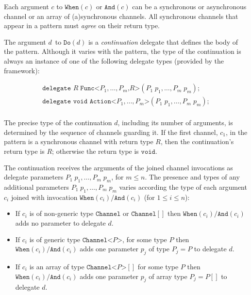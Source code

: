 \documentclass{article}
\newcommand{\dlongreturn}[2]{{\texttt{Func<}#2\texttt{,}#1\texttt{>}}}
\newcommand{\dlongreturnvoid}[1]{{\texttt{Action<}#1\texttt{>}}}
\newcommand{\dreturnvoid}[1]{{\texttt{Continuation}}}
\newcommand{\When}{\texttt{When}}
\newcommand{\And}{\texttt{And}}
\newcommand{\Do}{\texttt{Do}}
\newcommand{\channel}{\ensuremath{c}}
\newcommand{\delegate}{\ensuremath{d}}
\newcommand{\tvarr}{\ensuremath{R}}
\begin{document}
Each argument $\channel$ to $\When(\channel)$ or $\And(\channel)$ can be a synchronous or asynchronous channel or an array of (a)synchronous channels.
All synchronous channels that appear in a pattern must \emph{agree} on their return type.

The argument \delegate\ to $\Do(\delegate)$ is a \emph{continuation} delegate that defines the body of the pattern.
Although it varies with the pattern,  the type of the continuation is always an instance of one of the following delegate types (provided by the framework):

\[ 
\begin{array}{l}
  \texttt{delegate } \tvarr\; \dlongreturn{\tvarr}{P_1,\ldots,P_m}(P_1\;p_1, \ldots,  P_m\;p_m );\\
  \texttt{delegate void } \dlongreturnvoid{P_1,\ldots,P_m}(P_1\;p_1, \ldots,  P_m\;p_m );\\
\end{array}
\]

The precise type of the continuation \delegate, including its number of arguments, is determined by the sequence of channels guarding it.
If the first channel, $\channel_1$, in the pattern is a synchronous  channel with return type $\tvarr$, then
the continuation's return type is $\tvarr$; otherwise the return type is $\texttt{void}$.


The continuation receives the arguments of the joined channel invocations 
as delegate parameters $P_1\;p_1, \ldots,  P_m\;p_m$, for $m\leq n$.
The presence and types of any additional parameters $P_1\;p_1, \ldots,  P_m\;p_m$
varies according the type of each argument $\channel_i$ joined with 
invocation $\When(\channel_i)/\And(\channel_i)$ (for $1\leq i\leq n$):

\begin{itemize}
\item
If $\channel_i$ is of non-generic type $\texttt{Channel}$ or $\texttt{Channel}[]$ then $\When(\channel_i)/\And(\channel_i)$ adds no parameter to delegate \delegate.

\item
If $\channel_i$ is of generic type $\texttt{Channel<}P\texttt{>}$,  for some type $P$ then $\When(\channel_i)/\And(\channel_i)$ 
adds one parameter $p_j$ of type $P_j=P$ to delegate \delegate.

\item
If $\channel_i$ is an array of type $\texttt{Channel<}P\texttt{>}[]$ for some type $P$ then $\When(\channel_i)/\And(\channel_i)$ 
adds one parameter $p_j$ of array type $P_j=P[]$ to delegate \delegate.
\end{itemize}
\end{document}
